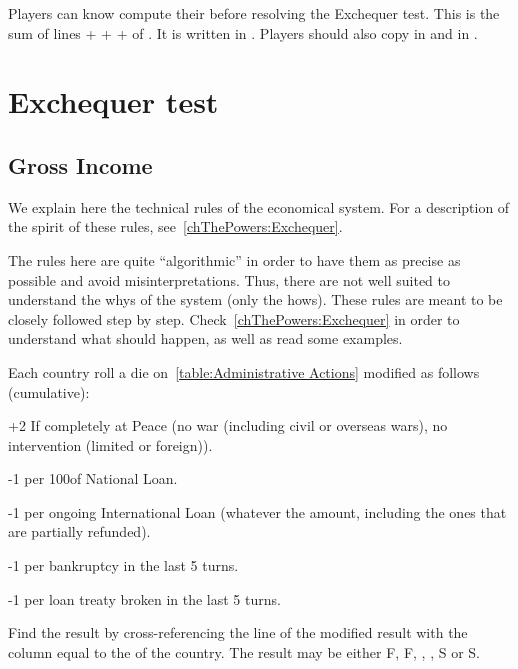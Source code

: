 \bparag Players can know compute their \RT before resolving the Exchequer
test.
\bparag This is the sum of lines  +
 +  +
 of \EcoRS. It is written in .
\bparag Players should also copy  in
 and  in
.

\section{Exchequer test}\label{chBudget:Exchequer test}
\subsection{Gross Income}
\begin{designnote}
  We explain here the technical rules of the economical system. For a
  description of the spirit of these rules, see~\ref{chThePowers:Exchequer}.

  The rules here are quite ``algorithmic'' in order to have them as precise as
  possible and avoid misinterpretations. Thus, there are not well suited to
  understand the whys of the system (only the hows). These rules are meant to
  be closely followed step by step. Check~\ref{chThePowers:Exchequer} in order
  to understand what should happen, as well as read some examples.
\end{designnote}

 Each country roll a die on~\ref{table:Administrative
  Actions} modified as follows (cumulative):
\begin{modlist}
\item[+2] If completely at Peace (no war (including civil or overseas wars),
  no intervention (limited or foreign)).
\item[-1 ] per 100\ducats of National Loan.
\item[-1] per ongoing International Loan (whatever the amount, including the
  ones that are partially refunded).
\item[-1 ] per bankruptcy in the last 5 turns.
\item[-1] per loan treaty broken in the last 5 turns.
\end{modlist}
\bparag Find the result by cross-referencing the line of the modified result
with the column equal to the \STAB of the country.
\bparag The result may be either F\textetoile, F, \undemi, \undemi\textetoile,
S or S\textetoile.


